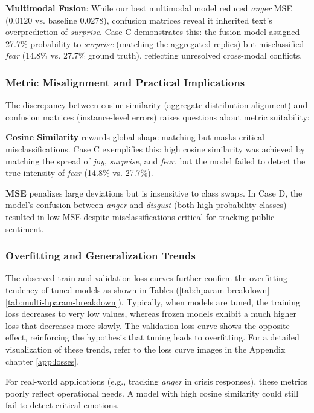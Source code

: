 \textbf{Multimodal Fusion}: While our best multimodal model reduced \emph{anger} MSE (0.0120 vs. baseline 0.0278), confusion matrices reveal it inherited text’s overprediction of \emph{surprise}. Case C demonstrates this: the fusion model assigned 27.7\% probability to \emph{surprise} (matching the aggregated replies) but misclassified \emph{fear} (14.8\% vs. 27.7\% ground truth), reflecting unresolved cross-modal conflicts.

\subsubsection*{Metric Misalignment and Practical Implications}
The discrepancy between cosine similarity (aggregate distribution alignment) and confusion matrices (instance-level errors) raises questions about metric suitability:
\newline

\textbf{Cosine Similarity} rewards global shape matching but masks critical misclassifications. Case C exemplifies this: high cosine similarity was achieved by matching the spread of \emph{joy}, \emph{surprise}, and \emph{fear}, but the model failed to detect the true intensity of \emph{fear} (14.8\% vs. 27.7\%).
\newline

\textbf{MSE} penalizes large deviations but is insensitive to class swaps. In Case D, the model’s confusion between \emph{anger} and \emph{disgust} (both high-probability classes) resulted in low MSE despite misclassifications critical for tracking public sentiment.

\subsubsection*{Overfitting and Generalization Trends}
The observed train and validation loss curves further confirm the overfitting tendency of tuned models as shown in Tables (\ref{tab:hparam-breakdown}--\ref{tab:multi-hparam-breakdown}). Typically, when models are tuned, the training loss decreases to very low values, whereas frozen models exhibit a much higher loss that decreases more slowly. The validation loss curve shows the opposite effect, reinforcing the hypothesis that tuning leads to overfitting. For a detailed visualization of these trends, refer to the loss curve images in the Appendix chapter \ref{app:losses}.
\newline

For real-world applications (e.g., tracking \emph{anger} in crisis responses), these metrics poorly reflect operational needs. A model with high cosine similarity could still fail to detect critical emotions.


